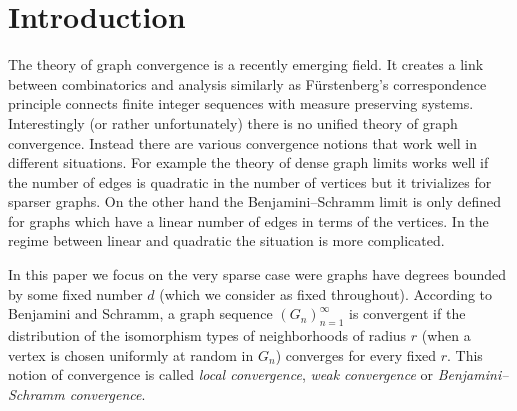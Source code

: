 \documentclass{article}
\begin{document}
\maketitle \addtolength{\baselineskip}{3pt}

\begin{abstract}
The colored neighborhood metric for sparse graphs was introduced by
Bollob\'as and Riordan \cite{BR}. The corresponding convergence
notion refines a convergence notion introduced by Benjamini and
Schramm \cite{BS}. We prove that even in this refined sense, the
limit of a convergent graph sequence (with uniformly bounded degree)
can be represented by a graphing. We study various topics related to
this convergence notion such as: Bernoulli graphings, factor of i.i.d.
processes and hyperfiniteness.
\end{abstract}

\newpage
\tableofcontents



\section{Introduction}
The theory of graph convergence is a recently emerging field. It
creates a link between combinatorics and analysis similarly as
F\"urstenberg's correspondence principle connects finite integer
sequences with measure preserving systems. Interestingly (or rather
unfortunately) there is no unified theory of graph convergence.
Instead there are various convergence notions that work well in
different situations. For example the theory of dense graph limits
\cite {LSz, LSz2, BCLSV1} works well if the number of edges is
quadratic in the number of vertices but it trivializes for sparser
graphs. On the other hand the Benjamini--Schramm limit \cite{BS} is
only defined for graphs which have a linear number of edges in terms
of the vertices. In the regime between linear and quadratic the
situation is more complicated.

In this paper we focus on the very sparse case were graphs have
degrees bounded by some fixed number $d$ (which we consider as fixed
throughout). According to Benjamini and Schramm, a graph sequence
$(G_n)_{n=1}^\infty$ is convergent if the distribution of the
isomorphism types of neighborhoods of radius $r$ (when a vertex is
chosen uniformly at random in $G_n$) converges for every fixed $r$.
This notion of convergence is called \emph{local convergence},
\emph{weak convergence} or  \emph{Benjamini--Schramm convergence}.
\end{document}
